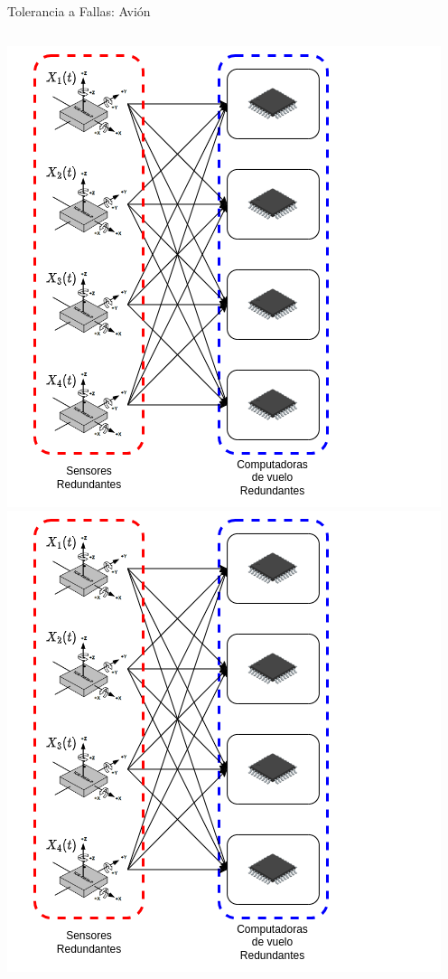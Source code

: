 \begin{frame}{Tolerancia a Fallas: Avión}
\begin{columns}
\begin{overprint}
				\includegraphics[width=\textwidth]{img/adquieren_sensores_2.png}
				\onslide<4>\includegraphics[width=\textwidth]{img/adquieren_sensores_2.png}

\end{overprint}
\end{columns}
\end{frame}
